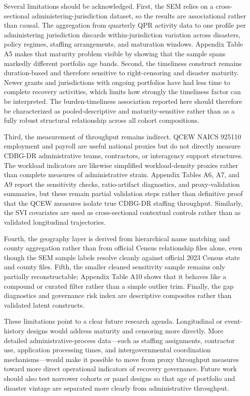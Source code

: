 \documentclass[
  number]{elsarticle}
\begin{document}
Several limitations should be acknowledged. First, the SEM relies on a
cross-sectional administering-jurisdiction dataset, so the results are
associational rather than causal. The aggregation from quarterly QPR
activity data to one profile per administering jurisdiction discards
within-jurisdiction variation across disasters, policy regimes, staffing
arrangements, and maturation windows. Appendix Table A5 makes that
maturity problem visible by showing that the sample spans markedly
different portfolio age bands. Second, the timeliness construct remains
duration-based and therefore sensitive to right-censoring and disaster
maturity. Newer grants and jurisdictions with ongoing portfolios have
had less time to complete recovery activities, which limits how strongly
the timeliness factor can be interpreted. The burden-timeliness
association reported here should therefore be characterized as
pooled-descriptive and maturity-sensitive rather than as a fully robust
structural relationship across all cohort compositions.

Third, the measurement of throughput remains indirect. QCEW NAICS 925110
employment and payroll are useful national proxies but do not directly
measure CDBG-DR administrative teams, contractors, or interagency
support structures. The workload indicators are likewise simplified
workload-density proxies rather than complete measures of administrative
strain. Appendix Tables A6, A7, and A9 report the sensitivity checks,
ratio-artifact diagnostics, and proxy-validation summaries, but these
remain partial validation steps rather than definitive proof that the
QCEW measures isolate true CDBG-DR staffing throughput. Similarly, the
SVI covariates are used as cross-sectional contextual controls rather
than as validated longitudinal trajectories.

Fourth, the geography layer is derived from hierarchical name matching
and county aggregation rather than from official Census relationship
files alone, even though the SEM sample labels resolve cleanly against
official 2023 Census state and county files. Fifth, the smaller cleaned
sensitivity sample remains only partially reconstructable; Appendix
Table A10 shows that it behaves like a compound or curated filter rather
than a simple outlier trim. Finally, the gap diagnostics and governance
risk index are descriptive composites rather than validated latent
constructs.

These limitations point to a clear future research agenda. Longitudinal
or event-history designs would address maturity and censoring more
directly. More detailed administrative-process data---such as staffing
assignments, contractor use, application processing times, and
intergovernmental coordination mechanisms---would make it possible to
move from proxy throughput measures toward more direct operational
indicators of recovery governance. Future work should also test narrower
cohorts or panel designs so that age of portfolio and disaster vintage
are separated more clearly from administrative throughput.
\end{document}
